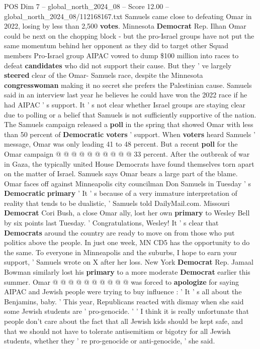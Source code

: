 \begin{textsample}{POS Dim 7 – global\_north\_2024\_08 – Score 12.00 – global\_north\_2024\_08/112168167.txt}  \label{ex:f7_pos_015}
Samuels came close to defeating Omar in 2022, losing by less than 2,500 \textbf{votes}.
Minnesota \textbf{Democrat} Rep.
Ilhan Omar could be next on the chopping block - but the pro-Israel groups have not put the same momentum behind her opponent as they did to target other Squad members Pro-Israel group AIPAC vowed to dump \$100 million into races to defeat \textbf{candidates} who did not support their cause.
But they ' ve largely \textbf{steered} clear of the Omar- Samuels race, despite the Minnesota \textbf{congresswoman} making it no secret she prefers the Palestinian cause.
Samuels said in an interview last year he believes he could have won the 2022 race if he had AIPAC ' s support.
It ' s not clear whether Israel groups are staying clear due to polling or a belief that Samuels is not sufficiently supportive of the nation.
The Samuels campaign released a \textbf{poll} in the spring that showed Omar with less than 50 percent of \textbf{Democratic} \textbf{voters} ' support.
When \textbf{voters} heard Samuels ' message, Omar was only leading 41 to 48 percent.
But a recent \textbf{poll} for the Omar campaign @ @ @ @ @ @ @ @ @ @ 33 percent.
After the outbreak of war in Gaza, the typically united House Democrats have found themselves torn apart on the matter of Israel.
Samuels says Omar bears a large part of the blame.
Omar faces off against Minneapolis city councilman Don Samuels in Tuesday ' s \textbf{Democratic} \textbf{primary} ' It ' s because of a very immature interpretation of reality that tends to be dualistic, ' Samuels told DailyMail.com.
Missouri \textbf{Democrat} Cori Bush, a close Omar ally, lost her own \textbf{primary} to Wesley Bell by six points last Tuesday. ' Congratulations, Wesley!
It ' s clear that \textbf{Democrats} around the country are ready to move on from those who put politics above the people.
In just one week, MN CD5 has the opportunity to do the same.
To everyone in Minneapolis and the suburbs, I hope to earn your support, ' Samuels wrote on X after her loss.
New York \textbf{Democrat} Rep.
Jamaal Bowman similarly lost his \textbf{primary} to a more moderate \textbf{Democrat} earlier this summer.
Omar @ @ @ @ @ @ @ @ @ @ was forced to \textbf{apologize} for saying AIPAC and Jewish people were trying to buy influence : ' It ' s all about the Benjamins, baby. ' This year, Republicans reacted with dismay when she said some Jewish students are ' pro-genocide. ' ' I think it is really unfortunate that people don't care about the fact that all Jewish kids should be kept safe, and that we should not have to tolerate antisemitism or bigotry for all Jewish students, whether they ' re pro-genocide or anti-genocide, ' she said.

\end{textsample}

